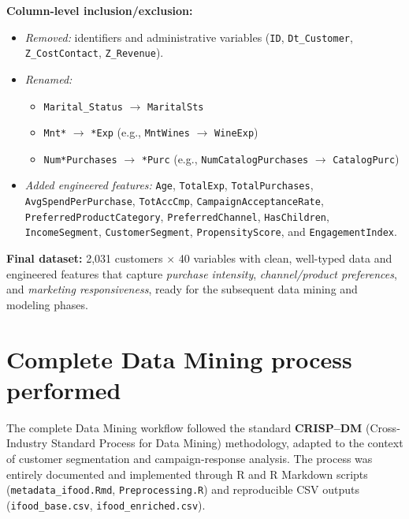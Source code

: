 \textbf{Column-level inclusion/exclusion:}
\begin{itemize}
    \item \textit{Removed:} identifiers and administrative variables (\texttt{ID}, \texttt{Dt\_Customer},
    \texttt{Z\_CostContact}, \texttt{Z\_Revenue}).
    \item \textit{Renamed:}
    \begin{itemize}
        \item \texttt{Marital\_Status} $\rightarrow$ \texttt{MaritalSts}
        \item \texttt{Mnt*} $\rightarrow$ \texttt{*Exp} (e.g., \texttt{MntWines} $\rightarrow$ \texttt{WineExp})
        \item \texttt{Num*Purchases} $\rightarrow$ \texttt{*Purc} (e.g., \texttt{NumCatalogPurchases} $\rightarrow$ \texttt{CatalogPurc})
    \end{itemize}
    \item \textit{Added engineered features:} \texttt{Age}, \texttt{TotalExp}, \texttt{TotalPurchases},
    \texttt{AvgSpendPerPurchase}, \texttt{TotAccCmp}, \texttt{CampaignAcceptanceRate},
    \texttt{PreferredProductCategory}, \texttt{PreferredChannel}, \texttt{HasChildren},
    \texttt{IncomeSegment}, \texttt{CustomerSegment}, \texttt{PropensityScore}, and \texttt{EngagementIndex}.
\end{itemize}

\noindent
\textbf{Final dataset:} 2,031 customers $\times$ 40 variables with clean,
well-typed data and engineered features that capture \textit{purchase intensity},
\textit{channel/product preferences}, and \textit{marketing responsiveness},
ready for the subsequent data mining and modeling phases.


\newpage
\section{Complete Data Mining process performed}

The complete Data Mining workflow followed the standard \textbf{CRISP--DM}
(Cross‐Industry Standard Process for Data Mining) methodology, adapted to the
context of customer segmentation and campaign‐response analysis.  
The process was entirely documented and implemented through R and R Markdown scripts
(\texttt{metadata\_ifood.Rmd}, \texttt{Preprocessing.R}) and reproducible
CSV outputs (\texttt{ifood\_base.csv}, \texttt{ifood\_enriched.csv}).

